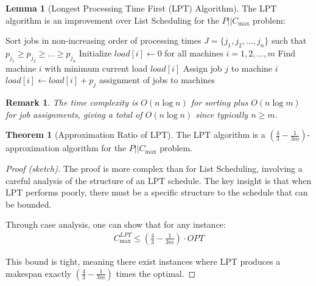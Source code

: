 \documentclass{article}
\newtheorem{remark}{Remark}
\theoremstyle{definition}
\newtheorem{theorem}{Theorem}
\newtheorem{lemma}{Lemma}
\begin{document}
\begin{lemma}[Longest Processing Time First (LPT) Algorithm]
The LPT algorithm is an improvement over List Scheduling for the $P||C_{\max}$ problem:

\begin{algorithm}
\caption{Longest Processing Time First (LPT)}
\begin{algorithmic}[1]
    \State Sort jobs in non-increasing order of processing times
    \State $J = \{j_1, j_2, \ldots, j_n\}$ such that $p_{j_1} \geq p_{j_2} \geq \ldots \geq p_{j_n}$
    \State Initialize $load[i] \gets 0$ for all machines $i = 1, 2, \ldots, m$
     
        \State Find machine $i$ with minimum current load $load[i]$
        \State Assign job $j$ to machine $i$
        \State $load[i] \gets load[i] + p_j$
    \EndFor
    \State \Return assignment of jobs to machines
\EndProcedure
\end{algorithmic}
\end{algorithm}

\begin{remark}
The time complexity is $O(n \log n)$ for sorting plus $O(n \log m)$ for job assignments, giving a total of $O(n \log n)$ since typically $n \geq m$.
\end{remark}
\end{lemma}

\begin{theorem}[Approximation Ratio of LPT]
The LPT algorithm is a $(\frac{4}{3} - \frac{1}{3m})$-approximation algorithm for the $P||C_{\max}$ problem.
\begin{proof}[Proof (sketch)]
The proof is more complex than for List Scheduling, involving a careful analysis of the structure of an LPT schedule. The key insight is that when LPT performs poorly, there must be a specific structure to the schedule that can be bounded.

Through case analysis, one can show that for any instance:
\begin{align}
C_{\max}^{LPT} \leq \left(\frac{4}{3} - \frac{1}{3m}\right) \cdot OPT
\end{align}

This bound is tight, meaning there exist instances where LPT produces a makespan exactly $(\frac{4}{3} - \frac{1}{3m})$ times the optimal.
\end{proof}
\end{theorem}
\end{document}
